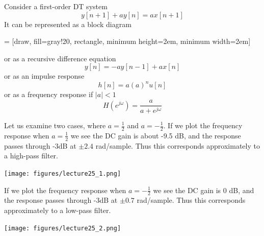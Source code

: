 \begin{example} Consider a first-order DT system
\[
y[n+1] + ay[n] = a x[n+1] 
\]
It can be represented as a block diagram
\begin{center}
   = [draw, fill=gray!20, rectangle, 
      minimum height=2em, minimum width=2em]
\end{center}
or as a recursive difference equation
\[
y[n] = -ay[n-1] + ax[n] 
\]
or as an impulse response
\[
h[n] = a(a)^n u[n]
\]
or as a frequency response if $|a| < 1$
\[
H\left(e^{j\omega}\right) = \frac{a}{a+e^{j\omega}} 
\]

Let us examine two cases, where $a = \tfrac{1}{2}$ and $a = -\tfrac{1}{2}$. If we plot the frequency response when $a = \tfrac{1}{2}$ we see the DC gain is about -9.5 dB, and the response passes through -3dB at $\pm 2.4$ rad/sample. Thus this corresponds approximately to a high-pass filter. 
\begin{center}   
  \texttt{[image: figures/lecture25\_1.png]}
\end{center}
If we plot the frequency response when $a = -\tfrac{1}{2}$ we see the DC gain is 0 dB, and the response passes through -3dB at $\pm 0.7$ rad/sample. Thus this corresponds approximately to a low-pass filter. 
\begin{center}   
  \texttt{[image: figures/lecture25\_2.png]}
\end{center}

\end{example}

